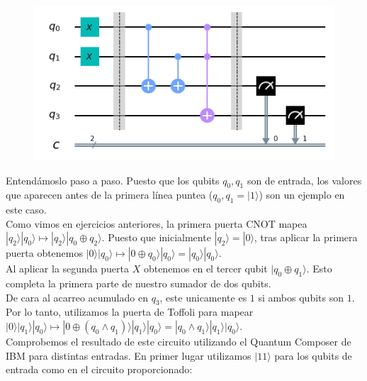 \documentclass[11pt]{article}
\newcommand{\ra}{\rangle}
\theoremstyle{plain}
\begin{document}
\begin{figure}[H]
	\centering
	\includegraphics[scale=0.8]{figures/sumator_statement2.png}
\end{figure}

Entendámoslo paso a paso. Puesto que los qubits $q_0, q_1$ son de entrada, los valores que aparecen antes de la primera línea puntea ($q_0, q_1 = |1\ra$) son un ejemplo en este caso. \\

Como vimos en ejercicios anteriores, la primera puerta CNOT mapea $|q_2\ra|q_0\ra \mapsto |q_2\ra|q_0 \oplus q_2\ra$. Puesto que inicialmente $|q_2\ra = |0\ra$, tras aplicar la primera puerta obtenemos $|0\ra|q_0\ra \mapsto |0 \oplus q_0\ra|q_0\ra = |q_0\ra|q_0\ra$. \\

Al aplicar la segunda puerta $X$ obtenemos en el tercer qubit $|q_0 \oplus q_1\ra$. Esto completa la primera parte de nuestro sumador de dos qubits. \\

De cara al acarreo acumulado en $q_3$, este unicamente es $1$ si ambos qubits son $1$. Por lo tanto, utilizamos la puerta de Toffoli para mapear $|0\ra|q_1\ra|q_0\ra \mapsto |0 \oplus (q_0 \wedge q_1)\ra|q_1\ra|q_0\ra = |q_0 \wedge q_1\ra|q_1\ra|q_0\ra $. \\

Comprobemos el resultado de este circuito utilizando el Quantum Composer de IBM para distintas entradas. En primer lugar utilizamos $|11\ra$ para los qubits de entrada como en el circuito proporcionado:
\end{document}
